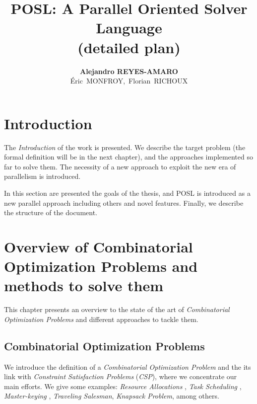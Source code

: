 \documentclass[a4paper]{book} %
\newcommand{\posl}{{\sc POSL}}
\newcommand{\COP}{\textit{Combinatorial Optimization Problem}}
\newcommand{\COPs}{\COP\textit{s}}
\newcommand{\CSP}{\textit{Constraint Satisfaction Problem}}
\newcommand{\CSPs}{\CSP\textit{s}}
\newcommand{\csp}{\textit{CSP}}
\begin{document}
\title{\posl: A Parallel Oriented Solver Language \\ {\small (detailed plan)}}
\author{\textbf{Alejandro REYES-AMARO}\\ \mbox{\'Eric MONFROY, Florian RICHOUX}}

\maketitle

\tableofcontents

\chapter{Introduction}

The \textit{Introduction} of the work is presented. We describe the target problem (the formal definition will be in the next chapter), and the approaches implemented so far to solve them. The necessity of a new approach to exploit the new era of parallelism is introduced. 

In this section are presented the goals of the thesis, and \posl{} is introduced as a new parallel approach including others and novel features. Finally, we describe the structure of the document. 

\chapter{Overview of Combinatorial Optimization Problems and methods to solve them}

This chapter presents an overview to the state of the art of \COPs{} and different approaches to tackle them. 

\section{Combinatorial Optimization Problems}

We introduce the definition of a \COP{} and the its link with \CSPs{} (\csp), where we concentrate our main efforts. We give some examples: {\it Resource Allocations} \cite{Akplogan2011}, \textit{Task Scheduling} \cite{Sibbesen2008}, \textit{Master-keying} \cite{Espelage2000}, \textit{Traveling Salesman}, \textit{Knapsack Problem}, among others.
\end{document}
